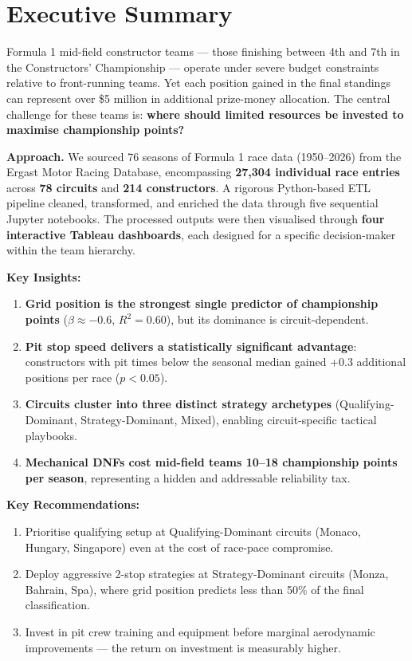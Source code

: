 \documentclass[12pt, a4paper]{article}
\begin{document}
\section{Executive Summary}

Formula 1 mid-field constructor teams --- those finishing between 4th and 7th in the Constructors' Championship --- operate under severe budget constraints relative to front-running teams. Yet each position gained in the final standings can represent over \$5 million in additional prize-money allocation. The central challenge for these teams is: \textbf{where should limited resources be invested to maximise championship points?}

\textbf{Approach.} We sourced 76 seasons of Formula 1 race data (1950--2026) from the Ergast Motor Racing Database, encompassing \textbf{27,304 individual race entries} across \textbf{78 circuits} and \textbf{214 constructors}. A rigorous Python-based ETL pipeline cleaned, transformed, and enriched the data through five sequential Jupyter notebooks. The processed outputs were then visualised through \textbf{four interactive Tableau dashboards}, each designed for a specific decision-maker within the team hierarchy.

\textbf{Key Insights:}
\begin{enumerate}[noitemsep]
    \item \textbf{Grid position is the strongest single predictor of championship points} ($\beta \approx -0.6$, $R^2 = 0.60$), but its dominance is circuit-dependent.
    \item \textbf{Pit stop speed delivers a statistically significant advantage}: constructors with pit times below the seasonal median gained +0.3 additional positions per race ($p < 0.05$).
    \item \textbf{Circuits cluster into three distinct strategy archetypes} (Qualifying-Dominant, Strategy-Dominant, Mixed), enabling circuit-specific tactical playbooks.
    \item \textbf{Mechanical DNFs cost mid-field teams 10--18 championship points per season}, representing a hidden and addressable reliability tax.
\end{enumerate}

\textbf{Key Recommendations:}
\begin{enumerate}[noitemsep]
    \item Prioritise qualifying setup at Qualifying-Dominant circuits (Monaco, Hungary, Singapore) even at the cost of race-pace compromise.
    \item Deploy aggressive 2-stop strategies at Strategy-Dominant circuits (Monza, Bahrain, Spa), where grid position predicts less than 50\% of the final classification.
    \item Invest in pit crew training and equipment before marginal aerodynamic improvements --- the return on investment is measurably higher.
\end{enumerate}
\end{document}
